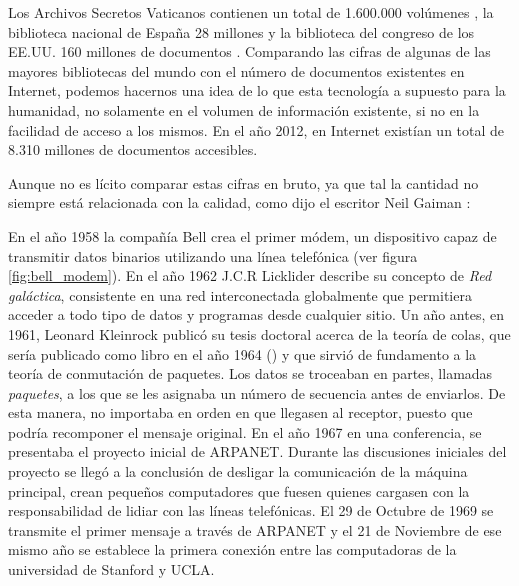 Los Archivos Secretos Vaticanos contienen un total de 1.600.000 volúmenes \cite{Bav15}, la biblioteca nacional de España 28 millones \cite{Sanz15} y la biblioteca del congreso de los \ac{EE.UU.} 160 millones de documentos \cite{Libr15}. Comparando las cifras de algunas de las mayores bibliotecas del mundo con el número de documentos existentes en Internet, podemos hacernos una idea de lo que esta tecnología a supuesto para la humanidad, no solamente en el volumen de información existente, si no en la facilidad de acceso a los mismos. En el año 2012, en Internet existían un total de 8.310 millones de documentos accesibles.

Aunque no es lícito comparar estas cifras en bruto, ya que tal la cantidad no siempre está relacionada con la calidad, como dijo el escritor Neil Gaiman \cite{Gaim10}:

\vspace{5mm}
\vspace{5mm}

En el año 1958 la compañía Bell crea el primer módem, un dispositivo capaz de transmitir datos binarios utilizando una línea telefónica (ver figura \ref{fig:bell_modem}). En el año 1962 J.C.R Licklider describe su concepto de \textit{Red galáctica}, consistente en una red interconectada globalmente que permitiera acceder a todo tipo de datos y programas desde cualquier sitio. Un año antes, en 1961, Leonard Kleinrock publicó su tesis doctoral acerca de la teoría de colas, que sería publicado como libro en el año 1964 (\cite{Klei64}) y que sirvió de fundamento a la teoría de conmutación de paquetes. Los datos se troceaban en partes, llamadas \textit{paquetes}, a los que se les asignaba un número de secuencia antes de enviarlos. De esta manera, no importaba en orden en que llegasen al receptor, puesto que podría recomponer el mensaje original.
En el año 1967 en una conferencia, se presentaba el proyecto inicial de \ac{ARPANET}. Durante las discusiones iniciales del proyecto se llegó a la conclusión de desligar la comunicación de la máquina principal, crean pequeños computadores que fuesen quienes cargasen con la responsabilidad de lidiar con las líneas telefónicas. El 29 de Octubre de 1969 se transmite el primer mensaje a través de \ac{ARPANET} y el 21 de Noviembre de ese mismo año se establece la primera conexión entre las computadoras de la universidad de Stanford y \ac{UCLA}. 

